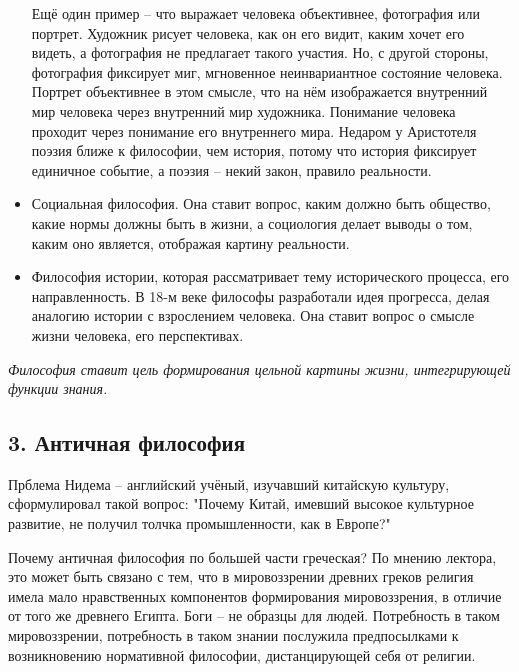 \documentclass[a4paper, 12pt]{book} %
\begin{document}
\begin{itemize}
Ещё один пример -- что выражает человека объективнее, фотография или портрет. Художник рисует человека, как он его видит, каким хочет его видеть, а фотография не предлагает такого участия. Но, с другой стороны, фотография фиксирует миг, мгновенное неинвариантное состояние человека. Портрет объективнее в этом смысле, что на нём изображается внутренний мир человека через внутренний мир художника. Понимание человека проходит через понимание его внутреннего мира. Недаром у Аристотеля поэзия ближе к философии, чем история, потому что история фиксирует единичное событие, а поэзия -- некий закон, правило реальности.

\item Социальная философия. Она ставит вопрос, каким должно быть общество, какие нормы должны быть в жизни, а социология делает выводы о том, каким оно является, отображая картину реальности. 

\item Философия истории, которая рассматривает тему исторического процесса, его направленность. В 18-м веке философы разработали идея прогресса, делая аналогию истории с взрослением человека. Она ставит вопрос о смысле жизни человека, его перспективах.
 	 
\end{itemize}
\textit{Философия ставит цель формирования цельной картины жизни, интегрирующей функции знания.}

\subsection*{3. Античная философия}

Прблема Нидема -- английский учёный, изучавший китайскую культуру, сформулировал такой вопрос: "Почему Китай, имевший высокое культурное развитие, не получил толчка промышленности, как в Европе?" 

Почему античная философия по большей части греческая? По мнению лектора, это может быть связано с тем, что в мировоззрении древних греков религия имела мало нравственных компонентов формирования мировоззрения, в отличие от того же древнего Египта. Боги -- не образцы для людей. Потребность в таком мировоззрении, потребность в таком знании послужила предпосылками к возникновению нормативной философии, дистанцирующей себя от религии.
\end{document}
